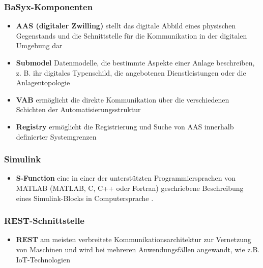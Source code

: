 \documentclass{beamer}
\begin{document}
\begin{frame}
    \frametitle{BaSyx-Komponenten}
    \begin{itemize}
        \item \textbf{AAS (digitaler Zwilling)} stellt das digitale Abbild eines physischen Gegenstands und die Schnittstelle für die Kommunikation in der digitalen Umgebung dar \cite{plattformindustrie4.0DiskussionspapierVerwaltungsschalePraxis}
        \item \textbf{Submodel} Datenmodelle, die bestimmte Aspekte einer Anlage beschreiben, z. B. ihr digitales Typenschild, die angebotenen Dienstleistungen oder die Anlagentopologie \cite{eclipsefoundationinc.BaSyxEclipsepedia}
        \item \textbf{VAB}  ermöglicht die direkte Kommunikation über die verschiedenen Schichten der Automatisierungsstruktur \cite{fraunhofer-institutfurexperimentellessoftwareengineeringieseBaSysFlyer}
        \item \textbf{Registry} ermöglicht die Registrierung und Suche von AAS innerhalb definierter Systemgrenzen \cite{eclipsefoundationinc.BaSyxEclipsepedia}
    \end{itemize}
\end{frame}
\begin{frame}
    \frametitle{Simulink}
    \begin{itemize}
        \item \textbf{S-Function} eine in einer der unterstützten Programmiersprachen von MATLAB (MATLAB, C, C++ oder Fortran) geschriebene Beschreibung eines Simulink-Blocks in Computersprache  \cite{themathworksinc.WhatSFunctionMATLAB}.
    \end{itemize}
\end{frame}
\begin{frame}
    \frametitle{REST-Schnittstelle}
    \begin{itemize}
        \item \textbf{REST} am meisten verbreitete Kommunikationsarchitektur zur Vernetzung von Maschinen und wird bei mehreren Anwendungsfällen angewandt, wie z.B. IoT-Technologien \cite{reinheimerIndustrieHerausforderungenKonzepte2017}
    \end{itemize}
\end{frame}
\end{document}
